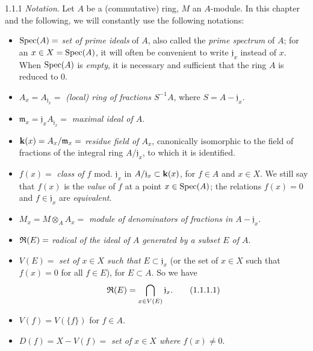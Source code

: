 
\begin{env}{1.1.1}
\label{env-1.1.1.1}
\emph{Notation}. Let $A$ be a (commutative) ring, $M$ an $A$-module. In
this chapter and the following, we will constantly use the following notations:
\begin{itemize}
  \item[] $\operatorname{Spec}(A)=$ \emph{set of prime ideals} of $A$, also called the
          \emph{prime spectrum} of $A$; for an $x\in X=\operatorname{Spec}(A)$, it will often be
          convenient to write $\mathfrak{j}_x$ instead of $x$. When $\operatorname{Spec}(A)$ is
          \emph{empty}, it is necessary and sufficient that the ring $A$ is
          reduced to $0$.
  \item[] $A_x=A_{\mathfrak{j}_x}=$ \emph{(local) ring of fractions $S^{-1}A$},
          where $S=A-\mathfrak{j}_x$.
  \item[] $\mathfrak{m}_x=\mathfrak{j}_x A_{\mathfrak{j}_x}=$ \emph{maximal ideal of $A$}.
  \item[] $\mathbf{k}(x)=A_x/\mathfrak{m}_x=$ \emph{residue field of $A_x$},
          canonically isomorphic to the field of fractions
          of the integral ring $A/\mathfrak{j}_x$, to which it is identified.
  \item[] $f(x)=$ \emph{class of $f$} mod. $\mathfrak{j}_x$ in $A/\mathfrak{j}_x\subset\mathbf{k}(x)$,
          for $f\in A$ and $x\in X$. We still say that $f(x)$ is the \emph{value}
          of $f$ at a point $x\in\operatorname{Spec}(A)$; the relations $f(x)=0$ and $f\in\mathfrak{j}_x$ are
          \emph{equivalent}.
  \item[] $M_x=M\otimes_A A_x=$ \emph{module of denominators of fractions in $A-\mathfrak{j}_x$}.
  \item[] $\mathfrak{R}(E)=$ \emph{radical of the ideal of $A$ generated by a subset $E$ of $A$}.
  \item[] $V(E)=$ \emph{set of $x\in X$ such that $E\subset\mathfrak{j}_x$} (or the set of $x\in X$
          such that $f(x)=0$ for all $f\in E$), for $E\subset A$. So we have
          \[
            \mathfrak{R}(E)=\bigcap_{x\in V(E)}\mathfrak{j}_x.\tag{1.1.1.1}
          \]
  \item[] $V(f)=V(\{f\})$ for $f\in A$.
  \item[] $D(f)=X-V(f)=$ \emph{set of $x\in X$ where $f(x)\neq 0$}.
\end{itemize}
\end{env}

